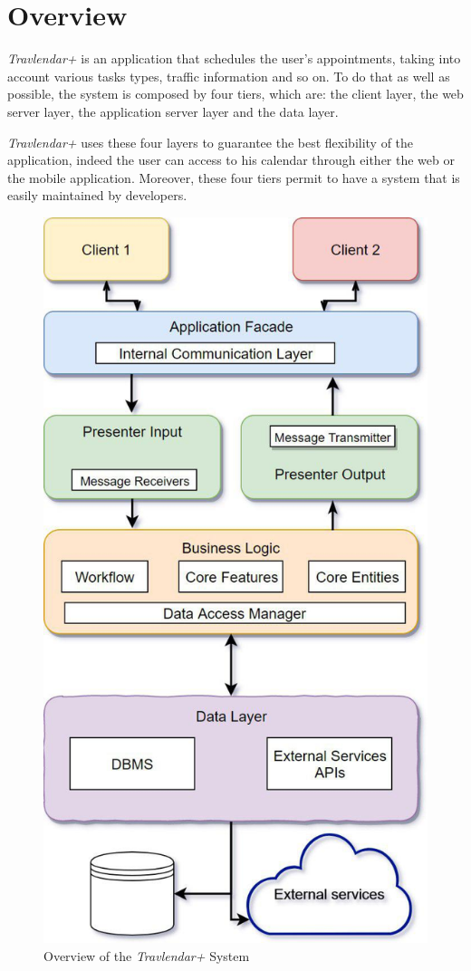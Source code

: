 \section{Overview}
\emph{Travlendar+} is an application that schedules the user's appointments, taking into account various tasks types, traffic information and so on. To do that as well as possible, the system is composed by four tiers, which are: the client layer, the web server layer, the application server layer and the data layer.

\emph{Travlendar+} uses these four layers to guarantee the best flexibility of the application, indeed the user can access to his calendar through either the web or the mobile application. Moreover, these four tiers permit to have a system that is easily maintained by developers.

\begin{figure}[H]
    \centering
    \includegraphics[scale=0.7]{Pictures/OverviewPictures/overviewDiagram.jpg}
    \caption{Overview of the \emph{Travlendar+} System}
\end{figure}

